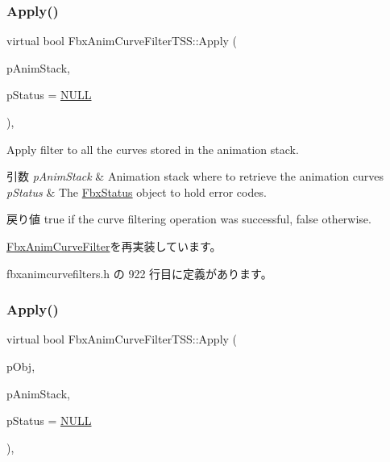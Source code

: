 \subsubsection{\texorpdfstring{Apply()}{Apply()}\hspace{0.1cm}{\footnotesize\ttfamily [1/5]}}
{\footnotesize\ttfamily virtual bool Fbx\+Anim\+Curve\+Filter\+T\+S\+S\+::\+Apply (\begin{DoxyParamCaption}\item[{\hyperlink{class_fbx_anim_stack}{Fbx\+Anim\+Stack} $\ast$}]{p\+Anim\+Stack,  }\item[{\hyperlink{class_fbx_status}{Fbx\+Status} $\ast$}]{p\+Status = {\ttfamily \hyperlink{fbxarch_8h_a070d2ce7b6bb7e5c05602aa8c308d0c4}{N\+U\+LL}} }\end{DoxyParamCaption})\hspace{0.3cm}{\ttfamily [inline]}, {\ttfamily [virtual]}}

Apply filter to all the curves stored in the animation stack. 
\begin{DoxyParams}{引数}
{\em p\+Anim\+Stack} & Animation stack where to retrieve the animation curves \\
\hline
{\em p\+Status} & The \hyperlink{class_fbx_status}{Fbx\+Status} object to hold error codes. \\
\hline
\end{DoxyParams}
\begin{DoxyReturn}{戻り値}
{\ttfamily true} if the curve filtering operation was successful, {\ttfamily false} otherwise. 
\end{DoxyReturn}


\hyperlink{class_fbx_anim_curve_filter_aef3900e6180e05661c27ee484ae939c3}{Fbx\+Anim\+Curve\+Filter}を再実装しています。



 fbxanimcurvefilters.\+h の 922 行目に定義があります。

\mbox{\label{class_fbx_anim_curve_filter_t_s_s_af45ca048d4dbffe6d12cbc42f6e26c10}} 
\subsubsection{\texorpdfstring{Apply()}{Apply()}\hspace{0.1cm}{\footnotesize\ttfamily [2/5]}}
{\footnotesize\ttfamily virtual bool Fbx\+Anim\+Curve\+Filter\+T\+S\+S\+::\+Apply (\begin{DoxyParamCaption}\item[{\hyperlink{class_fbx_object}{Fbx\+Object} $\ast$}]{p\+Obj,  }\item[{\hyperlink{class_fbx_anim_stack}{Fbx\+Anim\+Stack} $\ast$}]{p\+Anim\+Stack,  }\item[{\hyperlink{class_fbx_status}{Fbx\+Status} $\ast$}]{p\+Status = {\ttfamily \hyperlink{fbxarch_8h_a070d2ce7b6bb7e5c05602aa8c308d0c4}{N\+U\+LL}} }\end{DoxyParamCaption})\hspace{0.3cm}{\ttfamily [inline]}, {\ttfamily [virtual]}}

